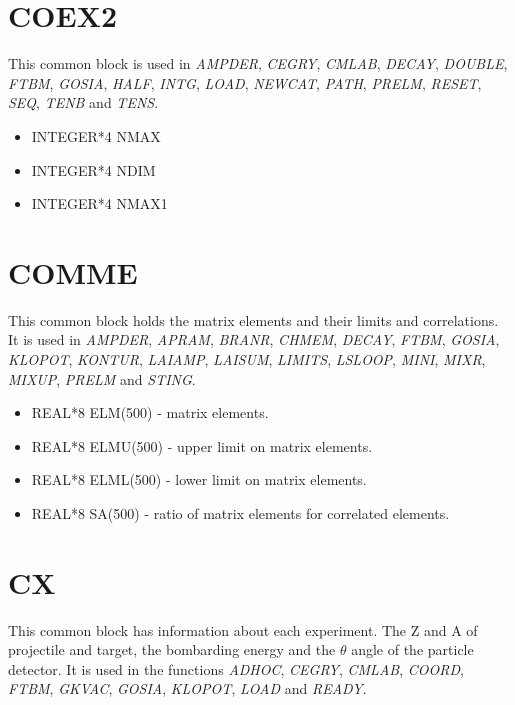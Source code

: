 \section{COEX2}

This common block is used in {\em AMPDER}, {\em CEGRY}, {\em CMLAB}, {\em
DECAY}, {\em DOUBLE}, {\em FTBM}, {\em GOSIA}, {\em HALF}, {\em INTG}, {\em
LOAD}, {\em NEWCAT}, {\em PATH}, {\em PRELM}, {\em RESET}, {\em SEQ}, {\em
TENB} and {\em TENS}.

\begin{itemize}
\item INTEGER*4 NMAX
\item INTEGER*4 NDIM
\item INTEGER*4 NMAX1
\end{itemize}

\section{COMME}

This common block holds the matrix elements and their limits and
correlations. It is used in {\em AMPDER}, {\em APRAM}, {\em BRANR}, {\em
CHMEM}, {\em DECAY}, {\em FTBM}, {\em GOSIA}, {\em KLOPOT}, {\em KONTUR},
{\em LAIAMP}, {\em LAISUM}, {\em LIMITS}, {\em LSLOOP}, {\em MINI}, {\em
MIXR}, {\em MIXUP}, {\em PRELM} and {\em STING}.

\begin{itemize}
\item REAL*8 ELM(500) - matrix elements.
\item REAL*8 ELMU(500) - upper limit on matrix elements.
\item REAL*8 ELML(500) - lower limit on matrix elements.
\item REAL*8 SA(500) - ratio of matrix elements for correlated elements.
\end{itemize}

\section{CX}

This common block has information about each experiment. The Z and A of
projectile and target, the bombarding energy and the $\theta$ angle of the
particle detector. It is used in the functions {\em ADHOC}, {\em CEGRY},
{\em CMLAB}, {\em COORD}, {\em FTBM}, {\em GKVAC}, {\em GOSIA}, {\em
KLOPOT}, {\em LOAD} and {\em READY}.

